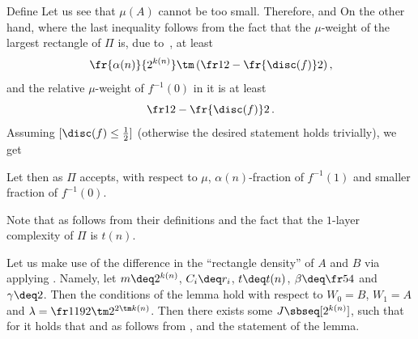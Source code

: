 Define
Let us see that $\mu(A)$ cannot be too small.
Therefore,
and
On the other hand,
where the last inequality follows from the fact that the $\mu$-weight of the largest rectangle of $\Pi$ is, due to~, at least
\[
  \fr{\alpha(n)}{2^{k(n)}} \tm \left(\fr12 - \fr{\disc(f)}2\right),
\]
and the relative $\mu$-weight of $f^{-1}(0)$ in it is at least
\[
  \fr12 - \fr{\disc(f)}2\,.
\]
Assuming $[\disc(f)\le\frac12]$ (otherwise the desired statement holds
trivially), we get 

Let
then
as $\Pi$ accepts, with respect to $\mu$, $\alpha(n)$-fraction of $f^{-1}(1)$ and smaller fraction of $f^{-1}(0)$.

Note that
as follows from their definitions and the fact that the $1$-layer complexity of $\Pi$ is $t(n)$.

Let us make use of the difference in the ``rectangle density'' of $A$ and $B$ via applying .
Namely, let $m\deq2^{k(n)}$, $C_i\deq r_i$, $t\deq t(n)$, $\beta\deq\fr54$ and $\gamma\deq2$. 
Then the conditions of the lemma hold with respect to $W_0=B$, $W_1=A$ and $\lambda=\fr1{192\tm2^{2\tm k(n)}}$.
Then there exists some $J\sbseq[2^{k(n)}]$, such that for
it holds that
and
as follows from ,  and the statement of the lemma.

